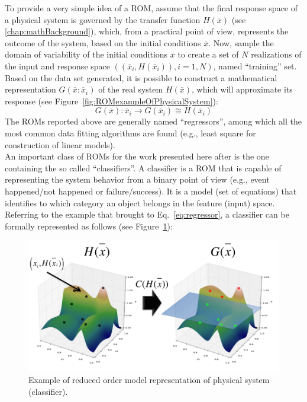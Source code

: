 To provide a very simple idea of a ROM, assume that the final 
response space of a physical system is governed by the transfer 
function $H \left (  \overline{x}\right)$ (see 
\ref{chap:mathBackground}), which, from a practical point of 
view, represents the outcome of the system, based on the initial 
conditions  $\overline{x}$. Now, sample the domain of variability of the 
initial conditions $\overline{x}$ to create a 
set of $N$ realizations of the input and response space $ \left ( \left ( 
\overline{x}_{i}, H \left (  \overline{x}_{i}\right) \right), i=1,N \right)$, 
named ``training'' set. Based on the data set generated, it is possible 
to construct a mathematical representation $G\left ( \overline{x}:
\overline{x}_{i}\right)$ of the 
real system $H \left (  \overline{x}\right)$, which will approximate its 
response (see Figure~\ref{fig:ROMexampleOfPhysicalSystem}):
\begin{equation}
\label{eq:regressor}
G\left ( \overline{x} \right ):\overline{x}_{i} \rightarrow G\left ( \overline{x}_{i} \right ) \cong H\left ( \overline{x}_{i} \right )
\end{equation}
The ROMs reported above are generally named ``regressors'', among 
which all the most common data fitting algorithms are found (e.g., 
least square for construction of linear models).
\\An important class of ROMs for the work presented here after is the 
one containing the so called ``classifiers''. A classifier is a ROM that is 
capable of representing the system behavior from a binary point of 
view (e.g., event happened/not happened or failure/success). It is a 
model (set of equations) that identifies to which category an object 
belongs in the feature (input) space. Referring to the example that 
brought to Eq.~\ref{eq:regressor}, a classifier can be formally represented as follows (see 
Figure~\ref{fig:ROMClassifierExampleOfPhysicalSystem}):
\begin{figure}[h!]
  \centering
  \includegraphics[width=1.0\textwidth]  {pics/ROMClassifierExampleOfPhysicalSystem.png}
  \caption{Example of reduced order model representation of physical system (classifier).}
  \label{fig:ROMClassifierExampleOfPhysicalSystem}
\end{figure}


